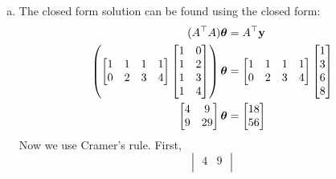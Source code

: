 \documentclass[12pt,letterpaper,fleqn]{hmcpset}
\begin{document}
\begin{enumerate}[(a)]
    \item 
        The closed form solution can be found using the closed form:
        \begin{align*}
            (A^\top A)\hbox{\boldmath$\theta$} &= A^\top {\bf y} \\
            \left(
                \begin{bmatrix} 
                1 & 1 & 1 & 1\\
                0 & 2 & 3 & 4          
                \end{bmatrix}
                \begin{bmatrix} 
                1 & 0 \\
                1 & 2 \\
                1 & 3 \\
                1 & 4\\          
                \end{bmatrix}              
                \right)\hbox{\boldmath$\theta$}
                &= 
                \begin{bmatrix} 
                1 & 1 & 1 & 1\\
                0 & 2 & 3 & 4          
                \end{bmatrix} 
                \begin{bmatrix}
                1 \\
                3 \\
                6 \\
                8 \\ 
                \end{bmatrix}\\
                \begin{bmatrix}
                 4 & 9 \\
                 9 & 29 \\
                \end{bmatrix} \hbox{\boldmath$\theta$}
                &= 
                \begin{bmatrix}
                 18 \\
                 56 \\
                \end{bmatrix}\\
        \end{align*}
        Now we use Cramer's rule. First, 
        $$\begin{vmatrix}
                 4 & 9 \\

\end{vmatrix}$$
\end{enumerate}
\end{document}
